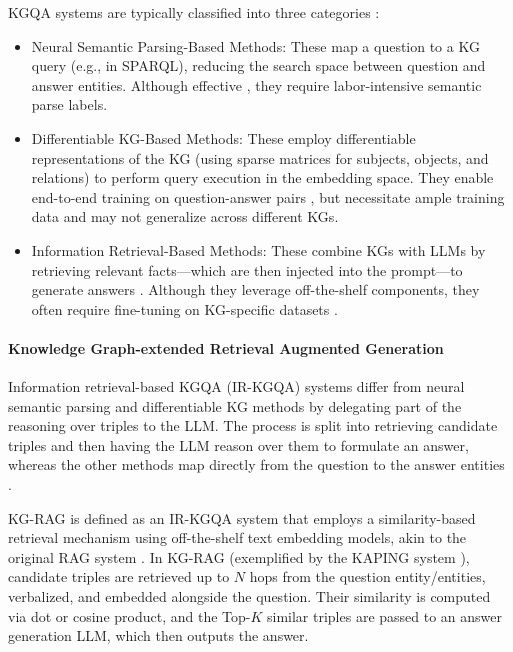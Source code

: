 \documentclass[pdflatex,sn-mathphys-num]{sn-jnl}%
\theoremstyle{thmstyleone}%
\theoremstyle{thmstyletwo}%
\theoremstyle{thmstylethree}%
\begin{document}
KGQA systems are typically classified into three categories \cite{Baek2023}:
\begin{itemize}
    \item Neural Semantic Parsing-Based Methods: These map a question to a KG query (e.g., in SPARQL), reducing the search space between question and answer entities. Although effective \cite{Yih2016}, they require labor-intensive semantic parse labels.
    \item Differentiable KG-Based Methods: These employ differentiable representations of the KG (using sparse matrices for subjects, objects, and relations) to perform query execution in the embedding space. They enable end-to-end training on question-answer pairs \cite{Oliya2021, Sen2023}, but necessitate ample training data and may not generalize across different KGs.
    \item Information Retrieval-Based Methods: These combine KGs with LLMs by retrieving relevant facts—which are then injected into the prompt—to generate answers \cite{Baek2023}. Although they leverage off-the-shelf components, they often require fine-tuning on KG-specific datasets \cite{Wu2023}.
\end{itemize}

\paragraph{Knowledge Graph-extended Retrieval Augmented Generation} Information retrieval-based KGQA (IR-KGQA) systems differ from neural semantic parsing and differentiable KG methods by delegating part of the reasoning over triples to the LLM. The process is split into retrieving candidate triples and then having the LLM reason over them to formulate an answer, whereas the other methods map directly from the question to the answer entities \cite{Oliya2021, Gu2022}.

KG-RAG is defined as an IR-KGQA system that employs a similarity-based retrieval mechanism using off-the-shelf text embedding models, akin to the original RAG system \cite{Lewis2020}. In KG-RAG (exemplified by the KAPING system \cite{Baek2023}), candidate triples are retrieved up to $N$ hops from the question entity/entities, verbalized, and embedded alongside the question. Their similarity is computed via dot or cosine product, and the Top-$K$ similar triples are passed to an answer generation LLM, which then outputs the answer.

\end{document}
